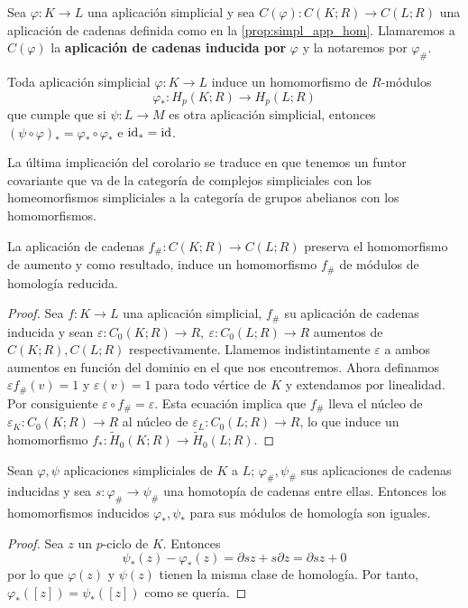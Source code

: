 \begin{definicion}
	\label{def:chain-map-ind}
	Sea $\varphi : K \to L$ una aplicación simplicial y sea $C(\varphi): C(K;R) \to C(L;R)$ una aplicación de cadenas definida como en la \autoref{prop:simpl_app_hom}. Llamaremos a $C(\varphi)$ la \textbf{aplicación de cadenas inducida por} $\varphi$ y la notaremos por $\varphi_\#$.
\end{definicion}
\begin{corolario}
	Toda aplicación simplicial $\varphi: K \to L$ induce un homomorfismo de $R$-módulos
	\[
		\varphi_* : H_p(K;R) \to H_p(L;R)
	\]
	que cumple que si $\psi: L \to M$ es otra aplicación simplicial, entonces $(\psi \circ \varphi)_*=\varphi_* \circ \varphi_*$ e $\operatorname{id}_* = \operatorname{id}$.
\end{corolario}
\begin{observacion}
	La última implicación del corolario se traduce en que tenemos un funtor covariante que va de la categoría de complejos simpliciales con los homeomorfismos simpliciales a la categoría de grupos abelianos con los homomorfismos.
\end{observacion}
\begin{lema}
	La aplicación de cadenas $f_\# : C(K;R) \to C(L;R)$ preserva el homomorfismo de aumento y como resultado, induce un homomorfismo $f_\#$ de módulos de homología reducida.
\end{lema}
\begin{proof}
	Sea $f : K \to L$ una aplicación simplicial, $f_\#$ su aplicación de cadenas inducida y sean $\varepsilon : C_0(K;R) \to R,\ \varepsilon : C_0(L;R) \to R$ aumentos de $C(K;R), C(L;R)$ respectivamente. Llamemos indistintamente $\varepsilon$ a ambos aumentos en función del dominio en el que nos encontremos. Ahora definamos $\varepsilon f_\#(v) = 1$ y $\varepsilon(v) = 1$ para todo vértice de $K$ y extendamos por linealidad. Por consiguiente $\varepsilon \circ f_\# = \varepsilon$. Esta ecuación implica que $f_\#$ lleva el núcleo de $\varepsilon_K: C_0(K;R) \to R$ al núcleo de $\varepsilon_L : C_0(L;R) \to R$, lo que induce un homomorfismo $f_* : \widetilde{H}_0(K;R) \to \widetilde{H}_0(L;R)$.
\end{proof}
\begin{teorema}
	Sean $\varphi, \psi$ aplicaciones simpliciales de $K$ a $L$; $\varphi_\#, \psi_\#$ sus aplicaciones de cadenas inducidas y sea $s: \varphi_\# \to \psi_\#$ una homotopía de cadenas entre ellas. Entonces los homomorfismos inducidos $\varphi_*, \psi_*$ para sus módulos de homología son iguales.
\end{teorema}
\begin{proof}
	Sea $z$ un $p$-ciclo de $K$. Entonces
	\[
		\psi_*(z) - \varphi_*(z) = \partial sz + s\partial z = \partial sz + 0
	\]
	por lo que $\varphi(z)$ y $\psi(z)$ tienen la misma clase de homología. Por tanto, $\varphi_*([z]) = \psi_*([z])$ como se quería.
\end{proof}

